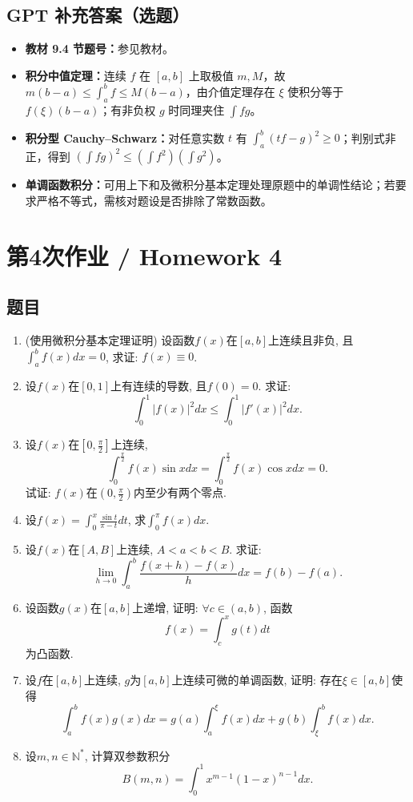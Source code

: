 \documentclass[UTF8,11pt, a4paper, oneside, fontset=none]{ctexbook}
\begin{document}
\subsection*{GPT 补充答案（选题）}
\begin{itemize}
\item \textbf{教材 9.4 节题号：}参见教材。
\item \textbf{积分中值定理：}连续 $f$ 在 $[a,b]$ 上取极值 $m,M$，故 $m(b-a)\le\int_a^b f\le M(b-a)$，由介值定理存在 $\xi$ 使积分等于 $f(\xi)(b-a)$；有非负权 $g$ 时同理夹住 $\int fg$。
\item \textbf{积分型 Cauchy--Schwarz：}对任意实数 $t$ 有 $\int_a^b(tf-g)^2\ge0$；判别式非正，得到 $(\int fg)^2\le(\int f^2)(\int g^2)$。
\item \textbf{单调函数积分：}可用上下和及微积分基本定理处理原题中的单调性结论；若要求严格不等式，需核对题设是否排除了常数函数。
\end{itemize}
\clearpage
\section{第4次作业 / Homework 4}
\subsection*{题目}
\begin{enumerate}

\item (使用微积分基本定理证明) 设函数$f(x)$在$[a, b]$上连续且非负, 且$\int_a^b f(x) dx =0$, 求证: $f(x) \equiv 0$.

\item 设$f(x)$在$[0, 1]$上有连续的导数, 且$f(0) =0$. 求证:
\[
\int_0^1 |f(x)|^2 dx \leq \int_0^1 |f'(x)|^2 dx.
\]

\item 设$f(x)$在$[0, \frac{\pi}{2}]$上连续,
\[
\int_0^{\frac{\pi}{2}} f(x) \sin x dx = \int_0^{\frac{\pi}{2}} f(x) \cos x dx =0.
\]
试证: $f(x)$在$(0, \frac{\pi}{2})$内至少有两个零点.

\item 设$f(x) = \int_0^x \frac{\sin t}{\pi - t} dt$, 求$\int_0^{\pi} f(x) dx$.

\item 设$f(x)$在$[A, B]$上连续, $A < a < b < B$. 求证:
\[
\lim_{h \to 0} \int_a^b \frac{f(x+h) - f(x)}{h} dx = f(b) - f(a).
\]

\item 设函数$g(x)$在$[a, b]$上递增, 证明: $\forall c \in (a, b)$, 函数
\[
f(x) = \int_c^x g(t) dt
\]
为凸函数.

\item 设$f$在$[a, b]$上连续, $g$为$[a, b]$上连续可微的单调函数, 证明: 存在$\xi \in [a, b]$使得
\[
\int_a^b f(x) g(x) dx = g(a) \int_a^{\xi} f(x) dx + g(b) \int_{\xi}^b f(x) dx.
\]

\item 设$m, n\in \mathbb N^*$, 计算双参数积分
\[
B(m, n) = \int_0^1 x^{m-1} (1-x)^{n-1} dx.
\]

\end{enumerate}
\clearpage
\end{document}
